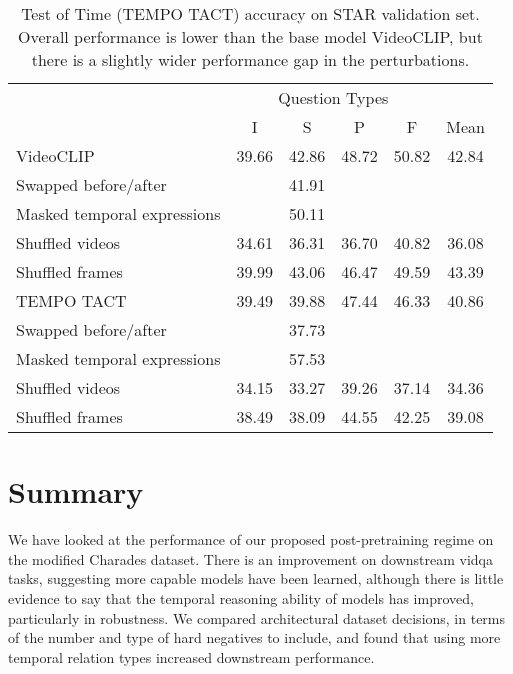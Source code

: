 \begin{table}[tp] 
    \centering 
    \caption{Test of Time (TEMPO TACT) accuracy on STAR validation set. Overall performance is
	lower than the base model VideoCLIP, but there is a slightly wider performance gap
	in the perturbations.}
    \label{tab:tot_star} 
    \begin{tabular}{lccccc} 
        \toprule
        \multicolumn{1}{c}{}    & \multicolumn{4}{c}{Question Types}            & \multicolumn{1}{c}{} \\
                                    \cmidrule(){2-5}
                                & I           & S        & P          & F           & Mean \\
        \cmidrule(r){1-1}           \cmidrule(){2-5}                                    \cmidrule(l){6-6}
        VideoCLIP		        & 39.66       & 42.86    & 48.72      & 50.82       & 42.84 \\
		Swapped before/after	&			  & 41.91	 &			  &				& \\
		Masked temporal expressions   &			  & 50.11    &			  &				& \\
		Shuffled videos			& 34.61		  & 36.31	 & 36.70	  & 40.82		& 36.08 \\
		Shuffled frames			& 39.99		  & 43.06	 & 46.47	  & 49.59		& 43.39 \\
		\midrule
		TEMPO TACT				& 39.49		  & 39.88	 & 47.44	  & 46.33		& 40.86 \\
		Swapped before/after    &			  & 37.73    &			  &				& \\
		Masked temporal expressions   &			  & 57.53    &			  &				& \\
		Shuffled videos			& 34.15		  & 33.27	 & 39.26	  & 37.14		& 34.36 \\
		Shuffled frames			& 38.49		  & 38.09	 & 44.55	  & 42.25		& 39.08 \\
        \bottomrule
    \end{tabular} 
\end{table} 

\section{Summary}
\label{sec:res_summary}

We have looked at the performance of our proposed post-pretraining regime on
the modified Charades dataset. There is an improvement on downstream
\acrshort{vidqa} tasks, suggesting more capable models have been learned,
although there is little evidence to say that the temporal reasoning ability of
models has improved, particularly in robustness. We compared architectural
dataset decisions, in terms of the number and type of hard negatives to
include, and found that using more temporal relation types increased downstream
performance.

